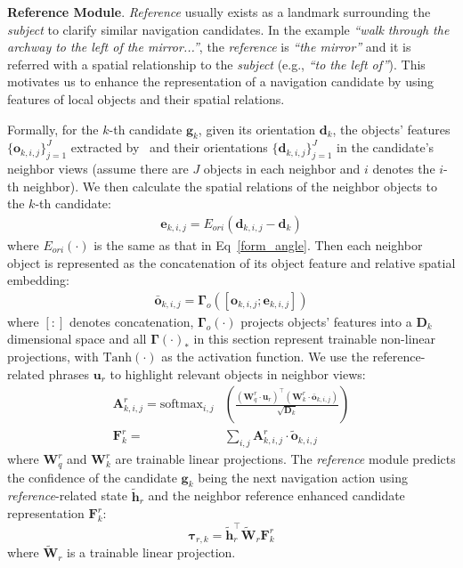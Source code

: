 \documentclass[sigconf]{acmart}
\begin{document}
\vspace{1mm}
\noindent\textbf{Reference Module}. \textit{Reference} usually exists as a landmark surrounding the \textit{subject} to clarify similar navigation candidates. 
In the example \textit{``walk through the archway to the left of the mirror...''}, the \textit{reference} is \textit{``the mirror''} and it is referred with a spatial relationship to the \textit{subject} (e.g., \textit{``to the left of''}). 
This motivates us to enhance the representation of a navigation candidate by using features of local objects and their spatial relations.

Formally, for the $k$-th candidate $\mathbf{g}_{k}$, given its orientation $\mathbf{d}_k$, the objects' features $\{\mathbf{o}_{k,i,j}\}_{j=1}^J$ extracted by~\cite{ren2015faster-rcnn} and their orientations $\{\mathbf{d}_{k,i,j}\}_{j=1}^J$ in the candidate's neighbor views (assume there are $J$ objects in each neighbor and $i$ denotes the $i$-th neighbor). 
We then calculate the spatial relations of the neighbor objects to the $k$-th candidate:
\begin{align}\label{form_rel_anlge}
    \mathbf{e}_{k,i,j}=E_{ori}(\mathbf{d}_{k,i,j}-\mathbf{d}_k)
\end{align}
where $E_{ori}(\cdot)$ is the same as that in Eq~\eqref{form_angle}. Then each neighbor object is represented as the concatenation of its object feature and relative spatial embedding:
\begin{align}
    \mathbf{\bar{o}}_{k,i,j}=\mathbf{\Gamma}_o([\mathbf{o}_{k,i,j};\mathbf{e}_{k,i,j}])
\end{align}
where $[:]$ denotes concatenation, $\mathbf{\Gamma}_o(\cdot)$ projects objects' features into a $\mathbf{D}_k$ dimensional space and all $\mathbf{\Gamma}(\cdot)_*$ in this section represent trainable non-linear projections, with $\textrm{Tanh}(\cdot)$ as the activation function. We use the reference-related phrases $\mathbf{u}_r$ to highlight relevant objects in neighbor views:
\begin{equation}
	\begin{aligned}
		\mathbf{A}_{k,i,j}^r=\textrm{softmax}_{i,j}&(\frac{(\mathbf{W}_q^r\cdot \mathbf{u}_r)^\top(\mathbf{W}_k^r\cdot \mathbf{\bar{o}}_{k,i,j})}{\sqrt{\mathbf{D}_k}})\\
		\mathbf{F}_k^r=&\sum_{i,j}\mathbf{A}_{k,i,j}^r\cdot \tilde{\mathbf{o}}_{k,i,j}
	\end{aligned}
\end{equation}
where $\mathbf{W}_q^r$ and $\mathbf{W}_k^r$ are trainable linear projections. The \textit{reference} module predicts the confidence of the candidate $\mathbf{g}_k$ being the next navigation action using \textit{reference}-related state
$\mathbf{\tilde{h}}_r$ and the neighbor reference enhanced candidate representation $\mathbf{F}_k^r$:
\begin{equation}
    \mathbf{\tau}_{r,k} = \mathbf{\tilde{h}}_r^\top \mathbf{\widetilde{W}}_r \mathbf{F}_k^r
\end{equation}
where $\mathbf{\widetilde{W}}_r$ is a trainable linear projection.
\end{document}
